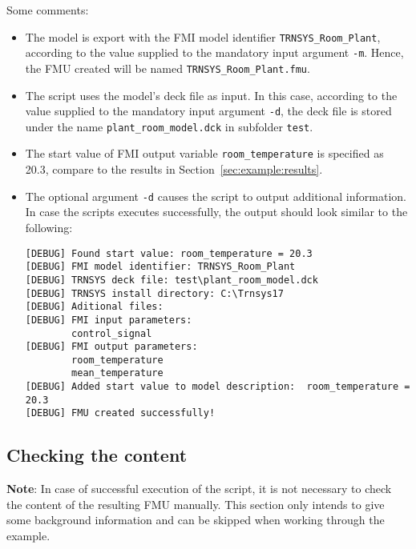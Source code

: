 Some comments:
\begin{itemize}
  \item The model is export with the FMI model identifier \verb!TRNSYS_Room_Plant!, according to the value supplied to the mandatory input argument \verb!-m!.
  Hence, the FMU created will be named \verb!TRNSYS_Room_Plant.fmu!.

  \item The \python script uses the model's deck file as input.
  In this case, according to the value supplied to the mandatory input argument \verb!-d!, the deck file is stored under the name \verb!plant_room_model.dck! in subfolder \texttt{test}.
  
  \item The start value of FMI output variable \verb!room_temperature! is specified as 20.3, compare to the results in Section~\ref{sec:example:results}.
  
  \item The optional argument \verb!-d! causes the script to output additional information. In case the scripts executes successfully, the output should look similar to the following:
\begin{verbatim}
[DEBUG] Found start value: room_temperature = 20.3
[DEBUG] FMI model identifier: TRNSYS_Room_Plant
[DEBUG] TRNSYS deck file: test\plant_room_model.dck
[DEBUG] TRNSYS install directory: C:\Trnsys17
[DEBUG] Aditional files:
[DEBUG] FMI input parameters:
        control_signal
[DEBUG] FMI output parameters:
        room_temperature
        mean_temperature
[DEBUG] Added start value to model description:  room_temperature = 20.3
[DEBUG] FMU created successfully!
\end{verbatim}

\end{itemize}


\subsection{Checking the content}

\textbf{Note}: In case of successful execution of the script, it is not necessary to check the content of the resulting FMU manually.
This section only intends to give some background information and can be skipped when working through the example.

